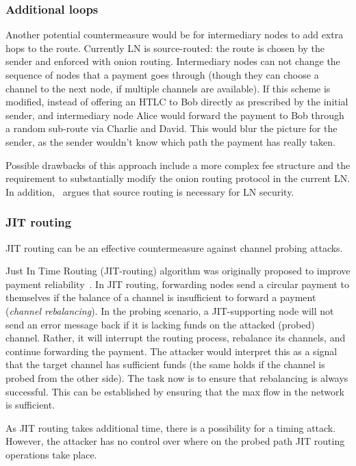 \subsubsection*{Additional loops}
Another potential countermeasure would be for intermediary nodes to add extra hops to the route.
Currently LN is source-routed: the route is chosen by the sender and enforced with onion routing.
Intermediary nodes can not change the sequence of nodes that a payment goes through (though they can choose a channel to the next node, if multiple channels are available).
If this scheme is modified, instead of offering an HTLC to Bob directly as prescribed by the initial sender, and intermediary node Alice would forward the payment to Bob through a random sub-route via Charlie and David.
This would blur the picture for the sender, as the sender wouldn't know which path the payment has really taken.

Possible drawbacks of this approach include a more complex fee structure and the requirement to substantially modify the onion routing protocol in the current LN.
In addition,~\cite{Malavolta2019} argues that source routing is necessary for LN security.

\subsubsection*{JIT routing}
JIT routing can be an effective countermeasure against channel probing attacks.

Just In Time Routing (JIT-routing) algorithm was originally proposed to improve payment reliability~\cite{Pickhardt2019, Pickhardt2019a}.
In JIT routing, forwarding nodes send a circular payment to themselves if the balance of a channel is insufficient to forward a payment (\textit{channel rebalancing}).
In the probing scenario, a JIT-supporting node will not send an error message back if it is lacking funds on the attacked (probed) channel.
Rather, it will interrupt the routing process, rebalance its channels, and continue forwarding the payment.
The attacker would interpret this as a signal that the target channel has sufficient funds (the same holds if the channel is probed from the other side).
The task now is to ensure that rebalancing is always successful.
This can be established by ensuring that the max flow in the network is sufficient.

As JIT routing takes additional time, there is a possibility for a timing attack. 
However, the attacker has no control over where on the probed path JIT routing operations take place. 


